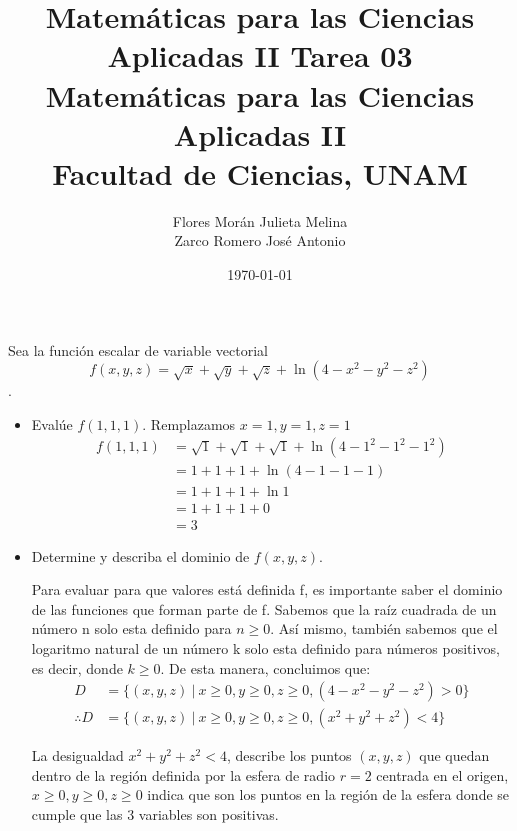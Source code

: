 \documentclass[12pt]{article}
\title{Matemáticas para las Ciencias Aplicadas II}
\title{
        \textbf{Tarea 03} \\
        \vspace{1ex}
        \large Matemáticas para las Ciencias Aplicadas II \\
        Facultad de Ciencias, UNAM}
\date{\today}
\author{Flores Morán Julieta Melina \\ Zarco Romero José Antonio}
\begin{document}
\maketitle

\section{}

Sea la función escalar de variable vectorial $$f(x,y,z)= \sqrt{x} +\sqrt{y} +\sqrt{z} + \ln{(4-x^2-y^2-z^2)}$$.

\begin{itemize}[format=\textbf]

\item Evalúe $f(1,1,1)$.
Remplazamos $x=1, y=1, z=1$
\begin{align*}
f(1,1,1)
&= \sqrt{1} +\sqrt{1} +\sqrt{1} + \ln{(4-1^2-1^2-1^2)} \\
&= 1+1+1+ \ln{(4-1-1-1)} \\
&= 1+1+1+ \ln{1} \\
&= 1+1+1+0 \\
&= 3
\end{align*}

\item Determine y describa el dominio de $f(x, y, z)$.

Para evaluar para que valores está definida f, es importante saber el dominio de las funciones que forman parte de f. Sabemos que la raíz cuadrada de un número n solo esta definido para $n \geq 0$. Así mismo, también sabemos que el logaritmo natural de un número k solo esta definido para números positivos, es decir, donde $k \geq 0$. De esta manera, concluimos que:\\
\begin{align*}
D
&=\{(x,y,z)~|~x \geq 0, y \geq 0, z \geq 0, (4-x^2-y^2-z^2) > 0\} \\
\therefore D
&= \{(x,y,z)~|~x \geq 0, y \geq 0, z \geq 0, (x^2+y^2+z^2) < 4\}
\end{align*}

La desigualdad $x^2+y^2+z^2<4$, describe los puntos $(x,y,z)$ que quedan dentro de la región definida por la esfera de radio $r=2$ centrada en el origen, $x \geq 0, y \geq 0, z \geq 0$ indica que son los puntos en la región de la esfera donde se cumple que las 3 variables son positivas.

\end{itemize}
\end{document}
